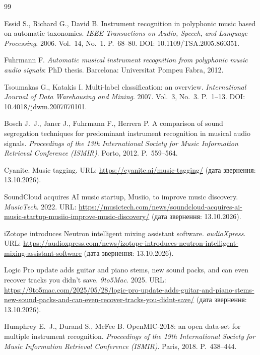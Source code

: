 
\begin{thebibliography}{99}

Essid S., Richard G., David B.
Instrument recognition in polyphonic music based on automatic taxonomies.
\textit{IEEE Transactions on Audio, Speech, and Language Processing}.
2006.
Vol.~14, No.~1.
P.~68--80.
DOI: 10.1109/TSA.2005.860351.

Fuhrmann F.
\textit{Automatic musical instrument recognition from polyphonic music audio signals}:
PhD thesis.
Barcelona: Universitat Pompeu Fabra, 2012.

Tsoumakas G., Katakis I.
Multi-label classification: an overview.
\textit{International Journal of Data Warehousing and Mining}.
2007.
Vol.~3, No.~3.
P.~1--13.
DOI: 10.4018/jdwm.2007070101.

Bosch J.~J., Janer J., Fuhrmann F., Herrera P.
A comparison of sound segregation techniques for predominant instrument recognition in musical audio signals.
\textit{Proceedings of the 13th International Society for Music Information Retrieval Conference (ISMIR)}.
Porto, 2012.
P.~559--564.

Cyanite. Music tagging.
URL: \url{https://cyanite.ai/music-tagging/}
(дата звернення: 13.10.2026).

SoundCloud acquires AI music startup, Musiio, to improve music discovery.
\textit{MusicTech}.
2022.
URL: \url{https://musictech.com/news/soundcloud-acquires-ai-music-startup-musiio-improve-music-discovery/}
(дата звернення: 13.10.2026).

iZotope introduces Neutron intelligent mixing assistant software.
\textit{audioXpress}.
URL: \url{https://audioxpress.com/news/izotope-introduces-neutron-intelligent-mixing-assistant-software}
(дата звернення: 13.10.2026).

Logic Pro update adds guitar and piano stems, new sound packs, and can even recover tracks you didn't save.
\textit{9to5Mac}.
2025.
URL: \url{https://9to5mac.com/2025/05/28/logic-pro-update-adds-guitar-and-piano-stems-new-sound-packs-and-can-even-recover-tracks-you-didnt-save/}
(дата звернення: 13.10.2026).

Humphrey E.~J., Durand S., McFee B.
OpenMIC-2018: an open data-set for multiple instrument recognition.
\textit{Proceedings of the 19th International Society for Music Information Retrieval Conference (ISMIR)}.
Paris, 2018.
P.~438--444.


\end{thebibliography}
